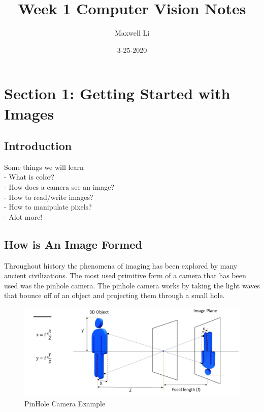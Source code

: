 \documentclass[fleqn]{article}
\title{Week 1 Computer Vision Notes}
\date{3-25-2020}
\author{Maxwell Li}
\begin{document}
  \color{black!20!white}
  \pagecolor{black!70!white}

  \maketitle
  \tableofcontents
  \setcounter{secnumdepth}{0}
  \newpage

  \section{\textbf{Section 1: Getting Started with Images}}
    \subsection{Introduction}
    Some things we will learn\\
    \quad - What is color?\\
    \quad - How does a camera see an image?\\
    \quad - How to read/write images?\\
    \quad - How to manipulate pixels?\\
    \quad - Alot more!

    \subsection{How is An Image Formed}
    Throughout history the phenomena of imaging has been explored by many ancient civilizations. The most used primitive form of a camera that has been used was the pinhole camera. The pinhole camera works by taking the light waves that bounce off of an object and projecting them through a small hole.

    \begin{figure}[h!]
      \includegraphics[width=\linewidth]{pinholecamera.png}
      \caption{PinHole Camera Example}
      \label{fig: Pinhole Camera}
    \end{figure}
\end{document}
